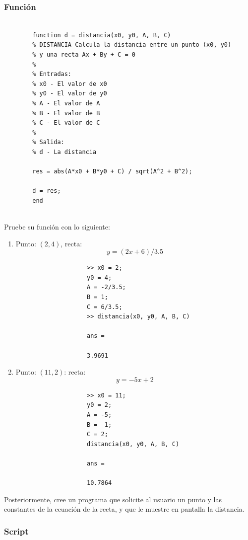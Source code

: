 \documentclass{article}
\begin{document}
	\subsubsection{Función}
	
	\begin{lstlisting}
		
		function d = distancia(x0, y0, A, B, C)
		% DISTANCIA Calcula la distancia entre un punto (x0, y0) 
		% y una recta Ax + By + C = 0
		%
		% Entradas:
		% x0 - El valor de x0
		% y0 - El valor de y0
		% A - El valor de A
		% B - El valor de B
		% C - El valor de C
		%
		% Salida:
		% d - La distancia
		
		res = abs(A*x0 + B*y0 + C) / sqrt(A^2 + B^2);
		
		d = res;
		end
		
	\end{lstlisting}
	
	Pruebe su función con lo siguiente:
	
	\begin{enumerate}[]
		\item 	Punto: $(2, 4)$, recta: 
				\begin{equation*}
					y = (2x + 6)/3.5
				\end{equation*}
				\begin{lstlisting}
					>> x0 = 2;
					y0 = 4;
					A = -2/3.5;
					B = 1;
					C = 6/3.5;
					>> distancia(x0, y0, A, B, C)
					
					ans =
					
					3.9691
				\end{lstlisting}
		\item	Punto: $(11, 2)$: recta:
				\begin{equation*}
					y = - 5x + 2
				\end{equation*}
				\begin{lstlisting}
					>> x0 = 11;
					y0 = 2;
					A = -5;
					B = -1;
					C = 2;
					distancia(x0, y0, A, B, C)
					
					ans =
					
					10.7864
				\end{lstlisting}
	\end{enumerate}
	
	Posteriormente, cree un programa que solicite al usuario un punto y las constantes de la ecuación de la recta, y que le muestre en pantalla la distancia.
	
	\subsubsection{Script}
	
\end{document}
